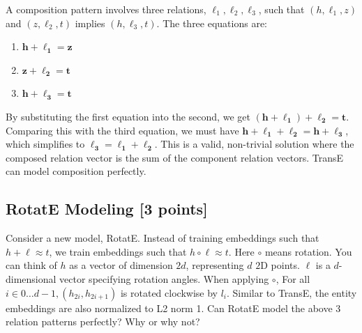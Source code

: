 \documentclass{article}
\numberwithin{figure}{section}
\begin{document}
{\begin{itemize}
		A composition pattern involves three relations, $\ell_1, \ell_2, \ell_3$, such that $(h, \ell_1, z)$ and $(z, \ell_2, t)$ implies $(h, \ell_3, t)$. The three equations are:
		\begin{enumerate}
			\item $\mathbf{h} + \boldsymbol{\ell_1} = \mathbf{z}$
			\item $\mathbf{z} + \boldsymbol{\ell_2} = \mathbf{t}$
			\item $\mathbf{h} + \boldsymbol{\ell_3} = \mathbf{t}$
		\end{enumerate}
		By substituting the first equation into the second, we get $(\mathbf{h} + \boldsymbol{\ell_1}) + \boldsymbol{\ell_2} = \mathbf{t}$. Comparing this with the third equation, we must have $\mathbf{h} + \boldsymbol{\ell_1} + \boldsymbol{\ell_2} = \mathbf{h} + \boldsymbol{\ell_3}$, which simplifies to $\boldsymbol{\ell_3} = \boldsymbol{\ell_1} + \boldsymbol{\ell_2}$. This is a valid, non-trivial solution where the composed relation vector is the sum of the component relation vectors. TransE can model composition perfectly.
	\end{itemize}
}

\subsection{RotatE Modeling [3 points]}
Consider a new model, RotatE. Instead of training embeddings such that $h+\ell \approx t$, we train embeddings such that $h \circ \ell \approx t$. Here $\circ$ means rotation. You can think of $h$ as a vector of dimension $2 d$, representing $d$ $2 \mathrm{D}$ points. $\ell$ is a $d$-dimensional vector specifying rotation angles. When applying $\circ$, For all $i \in 0 \ldots d-1, \left(h_{2 i}, h_{2 i+1}\right)$ is rotated clockwise by $l_i$. Similar to TransE, the entity embeddings are also normalized to L2 norm 1. Can RotatE model the above 3 relation patterns perfectly? Why or why not?
\end{document}
